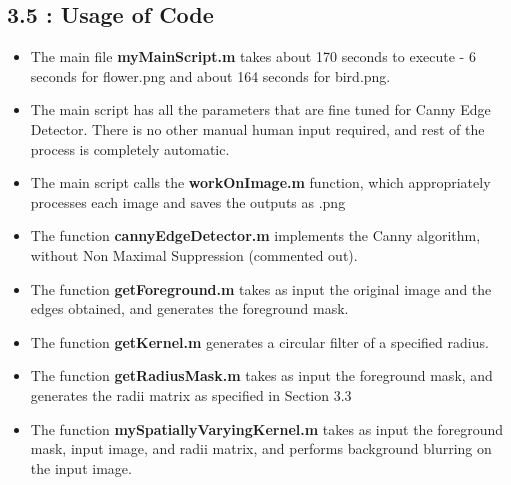 \documentclass[12pt, a4paper]{article}
\begin{document}
\subsection*{3.5 : Usage of Code}
\begin{itemize}
\item The main file \textbf{myMainScript.m} takes about 170 seconds to execute - 6 seconds for flower.png and about 164 seconds for bird.png.
\item The main script has all the parameters that are fine tuned for Canny Edge Detector. There is no other manual human input required, and rest of the process is completely automatic.
\item The main script calls the \textbf{workOnImage.m} function, which appropriately processes each image and saves the outputs as .png
\item The function \textbf{cannyEdgeDetector.m} implements the Canny algorithm, without Non Maximal Suppression (commented out).
\item The function \textbf{getForeground.m} takes as input the original image and the edges obtained, and generates the foreground mask.
\item The function \textbf{getKernel.m} generates a circular filter of a specified radius.
\item The function \textbf{getRadiusMask.m} takes as input the foreground mask, and generates the radii matrix as specified in Section 3.3
\item The function \textbf{mySpatiallyVaryingKernel.m} takes as input the foreground mask, input image, and radii matrix, and performs background blurring on the input image. 
\end{itemize}
\end{document}
